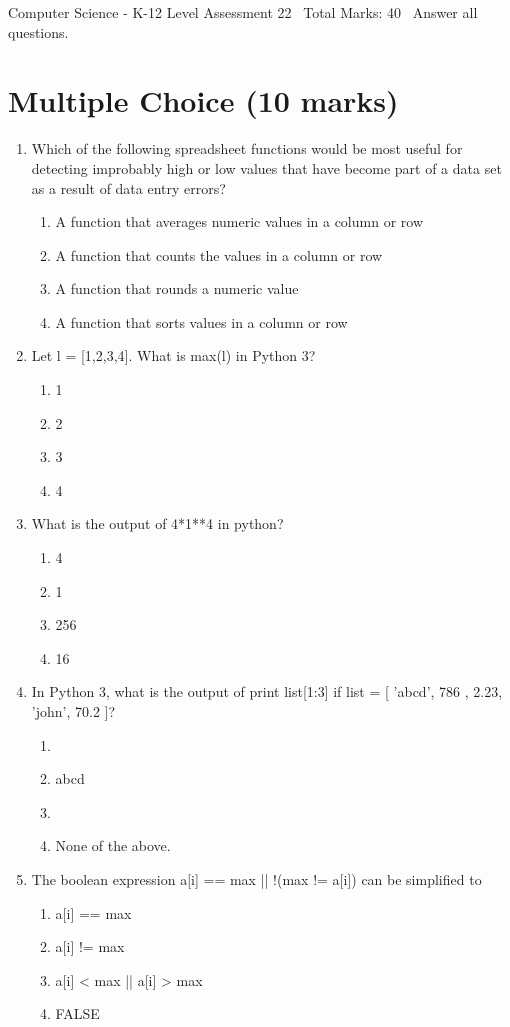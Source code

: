 \documentclass[12pt]{article}
\begin{document}
\begin{center}
Computer Science - K-12 Level Assessment 22 \
Total Marks: 40 \
Answer all questions.
\end{center}

\section*{Multiple Choice (10 marks)}
\begin{enumerate}[label=\arabic*.]
\item Which of the following spreadsheet functions would be most useful for detecting improbably high or low values that have become part of a data set as a result of data entry errors?
\begin{enumerate}[label=(\alph*)]
    \item A function that averages numeric values in a column or row
    \item A function that counts the values in a column or row
    \item A function that rounds a numeric value
    \item A function that sorts values in a column or row
\end{enumerate}
\item Let l = [1,2,3,4]. What is max(l) in Python 3?
\begin{enumerate}[label=(\alph*)]
    \item 1
    \item 2
    \item 3
    \item 4
\end{enumerate}
\item What is the output of 4*1**4 in python?
\begin{enumerate}[label=(\alph*)]
    \item 4
    \item 1
    \item 256
    \item 16
\end{enumerate}
\item In Python 3, what is the output of print list[1:3] if list = [ 'abcd', 786 , 2.23, 'john', 70.2 ]?
\begin{enumerate}[label=(\alph*)]
    \item [ 'abcd', 786 , 2.23, 'john', 70.2 ]
    \item abcd
    \item [786, 2.23]
    \item None of the above.
\end{enumerate}
\item The boolean expression a[i] == max || !(max != a[i]) can be simplified to
\begin{enumerate}[label=(\alph*)]
    \item a[i] == max
    \item a[i] != max
    \item a[i] \textless{} max || a[i] \textgreater{} max
    \item FALSE
\end{enumerate}
\end{enumerate}
\end{document}
